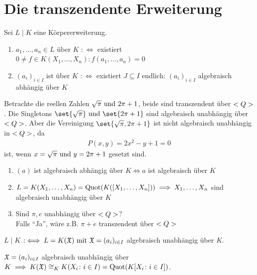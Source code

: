 \section{Die transzendente Erweiterung}
Sei $L\mid K$ eine Körpererweiterung.
\begin{definition}
	\begin{enumerate}[label=(\alph*)]
		\item $a_1, \dots, a_n \in L$  über $K$ $: \iff $ existiert \\$0 \neq f \in K(X_1,\dots, X_n) \colon f(a_1, \dots, a_n) = 0$
		\item $(a_i)_{i\in I}$ ist  über $K$ $:\iff$ existiert $J \subseteq I$ endlich: $(a_i)_{i\in I}$ algebraisch abhängig über $K$
	\end{enumerate}
\end{definition}
\begin{*example}
	Betrachte die reellen Zahlen $\sqrt{\pi} \text{ und } 2\pi +1$, beide sind transzendent über $<Q>$. Die Singletons $\set{\sqrt{\pi}}\und \set{2\pi +1}$ sind algebraisch unabhängig über $<Q>$. Aber die Vereinigung $\set{\sqrt{\pi}, 2\pi +1}$ ist nicht algebraisch unabhängig in $<Q>$, da
	\begin{align*}
		P(x,y) = 2x^2 - y + 1 = 0
	\end{align*}
	ist, wenn $x = \sqrt{\pi} \text{ und } y = 2\pi +1$ gesetzt sind.
\end{*example}
\begin{remark}
	\begin{enumerate}[label=(\alph*)]
		\item $(a)$ ist algebraisch abhängig über $K \iff a$ ist algebraisch über $K$
		\item $L = K(X_1,\dots, X_n) = \operatorname{Quot}(K([X_1,\dots, X_n])) \implies X_1,\dots, X_n$ sind algebraisch unabhängig über $K$
		\item Sind $\pi, e$ unabhängig über $<Q>$?\\
		Falls ``Ja'', wäre z.B. $\pi+e$ transzendent über $<Q>$
	\end{enumerate}
\end{remark}
\begin{definition}
	$L \mid K$  $:\iff L = K(\mathfrak{X}) \text{ mit } \mathfrak{X} = (a_i)_{i\in I}$ algebraisch unabhängig über $K$.
\end{definition}
\begin{lemma}
	$\mathfrak{X} = (a_i)_{i \in I}$ algebraisch unabhängig über $K \implies K(\mathfrak{X}) \cong_K K(X_i \colon i \in I) = \operatorname{Quot}(K[X_i \colon i \in I])$. 
\end{lemma}
